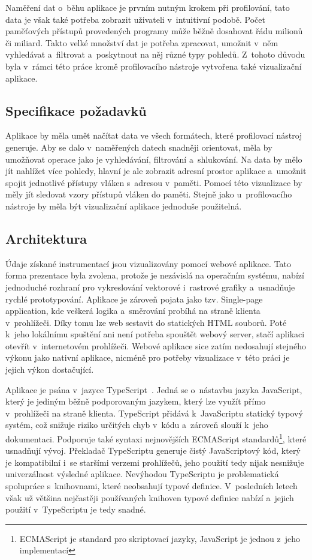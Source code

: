 Naměření dat o~běhu aplikace je prvním nutným krokem při profilování, tato data je však také potřeba zobrazit uživateli v~intuitivní podobě. Počet paměťových přístupů provedených programy může běžně dosahovat řádu milionů či miliard. Takto velké množství dat je potřeba zpracovat, umožnit v~něm vyhledávat a~filtrovat a~poskytnout na něj různé typy pohledů. Z~tohoto důvodu byla v~rámci této práce kromě profilovacího nástroje vytvořena také vizualizační aplikace.

\subsection{Specifikace požadavků}
Aplikace by měla umět načítat data ve všech formátech, které profilovací nástroj generuje. Aby se dalo v~naměřených datech snadněji orientovat, měla by umožňovat operace jako je vyhledávání, filtrování a~shlukování. Na data by mělo jít nahlížet více pohledy, hlavní je ale zobrazit adresní prostor aplikace a~umožnit spojit jednotlivé přístupy vláken s~adresou v~paměti. Pomocí této vizualizace by měly jít sledovat vzory přístupů vláken do paměti. Stejně jako u~profilovacího nástroje by měla být vizualizační aplikace jednoduše použitelná.

\subsection{Architektura}
Údaje získané instrumentací jsou vizualizovány pomocí webové aplikace. Tato forma prezentace byla zvolena, protože je nezávislá na operačním systému, nabízí jednoduché rozhraní pro vykreslování vektorové i~rastrové grafiky a~usnadňuje rychlé prototypování. Aplikace je zároveň pojata jako tzv. Single-page application, kde veškerá logika a~směrování probíhá na straně klienta v~prohlížeči. Díky tomu lze web sestavit do statických HTML souborů. Poté k~jeho lokálnímu spuštění ani není potřeba spouštět webový server, stačí aplikaci otevřít v~internetovém prohlížeči. Webové aplikace sice zatím nedosahují stejného výkonu jako nativní aplikace, nicméně pro potřeby vizualizace v~této práci je jejich výkon dostačující.

Aplikace je psána v~jazyce TypeScript~\cite{typescript}. Jedná se o~nástavbu jazyka JavaScript, který je jediným běžně podporovaným jazykem, který lze využít přímo v~prohlížeči na straně klienta. TypeScript přidává k~JavaScriptu statický typový systém, což snižuje riziko určitých chyb v~kódu a~zároveň slouží k~jeho dokumentaci. Podporuje také syntaxi nejnovějších ECMAScript standardů\footnote{ECMAScript je standard pro skriptovací jazyky, JavaScript je jednou z~jeho implementací}, které usnadňují vývoj. Překladač TypeScriptu generuje čistý JavaScriptový kód, který je kompatibilní i~se staršími verzemi prohlížečů, jeho použití tedy nijak nesnižuje univerzálnost výsledné aplikace. Nevýhodou TypeScriptu je problematická spolupráce s~knihovnami, které neobsahují typové definice. V~posledních letech však už většina nejčastěji používaných knihoven typové definice nabízí a~jejich použití v~TypeScriptu je tedy snadné.

